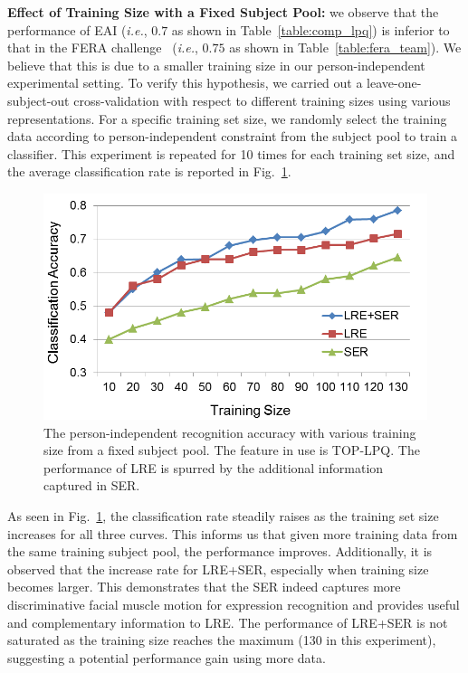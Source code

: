 \documentclass[journal]{IEEEtran}
\begin{document}
\textbf{Effect of Training Size with a Fixed Subject Pool:} we observe that the performance of EAI (\textit{i.e.}, $0.7$ as shown in Table~\ref{table:comp_lpq}) is inferior to that in the FERA challenge~\cite{Yang_SMCB12} (\textit{i.e.}, $0.75$ as shown in Table~\ref{table:fera_team}). We believe that this is due to a smaller training size in our person-independent experimental setting. To verify this hypothesis, we carried out a leave-one-subject-out cross-validation with respect to different training sizes using various representations. For a specific training set size, we randomly select the training data according to person-independent constraint from the subject pool to train a classifier. This experiment is repeated for 10 times for each training set size, and the average classification rate is reported in Fig.~\ref{fig:effect_training_size}. 

\begin{figure}[!h]
	\centering
		\includegraphics[width=.8\columnwidth]{pics/effect_training_size.png}
	\caption{The person-independent recognition accuracy with various training size from a fixed subject pool. The feature in use is TOP-LPQ. The performance of LRE is spurred by the additional information captured in SER.}
	\label{fig:effect_training_size}
\end{figure}

As seen in Fig.~\ref{fig:effect_training_size}, the classification rate steadily raises as the training set size increases for all three curves. This informs us that given more training data from the same training subject pool, the performance improves. Additionally, it is observed that the increase rate for LRE+SER, especially when training size becomes larger. This demonstrates that the SER indeed captures more discriminative facial muscle motion for expression recognition and provides useful and complementary information to LRE. The performance of LRE+SER is not saturated as the training size reaches the maximum (130 in this experiment), suggesting a potential performance gain using more data.
\end{document}
